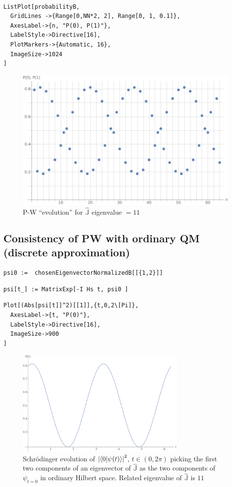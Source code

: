 \begin{Verbatim}

ListPlot[probabilityB,
  GridLines ->{Range[0,NN*2, 2], Range[0, 1, 0.1]},
  AxesLabel->{n, "P(0), P(1)"},
  LabelStyle->Directive[16],
  PlotMarkers->{Automatic, 16},
  ImageSize->1024
]
\end{Verbatim}
\begin{figure}[!h]
  \centering
  \includegraphics[width=.75\textwidth]{img/N32-B.png}
  \caption[(from notebook)]{P-W ``evolution'' for $\hat{\mathbb{J}}$ eigenvalue $=11$}
\end{figure}

\subsection{Consistency of PW with ordinary QM (discrete approximation)}

\begin{Verbatim}
psi0 :=  chosenEigenvectorNormalizedB[[{1,2}]]
\end{Verbatim}

\begin{Verbatim}
psi[t_] := MatrixExp[-I Hs t, psi0 ]
\end{Verbatim}

\begin{Verbatim}
Plot[(Abs[psi[t]]^2)[[1]],{t,0,2\[Pi]},
  AxesLabel->{t, "P(0)"},
  LabelStyle->Directive[16],
  ImageSize->900
]
\end{Verbatim}
\begin{figure}[!h]
  \centering
  \includegraphics[width=0.75\textwidth]{img/probB_0.png}
  \caption[(from notebook)]{
    Schr{\"o}dinger evolution of
    $\qty|\braket{0}{\psi(t)}|^2$, $t \in (0, 2\pi) $
    picking the first two components of an eigenvector of $\hat{\mathbb{J}}$
    as the two components of $\psi_{t=0}$ in ordinary Hilbert space.
    Related eigenvalue of $\hat{\mathbb{J}}$ is $11$
  }
\end{figure}

